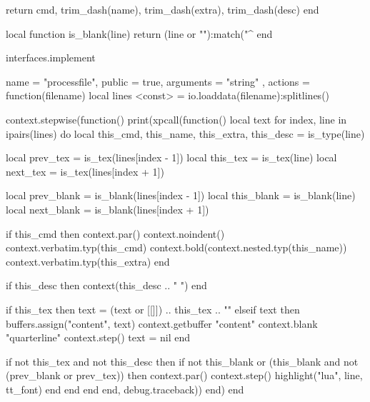         return cmd, trim_dash(name), trim_dash(extra), trim_dash(desc)
    end

    local function is_blank(line)
        return (line or ""):match("^%
    end

    interfaces.implement {
        name = "processfile",
        public = true,
        arguments = { "string" },
        actions = function(filename)
            local lines <const> = io.loaddata(filename):splitlines()

            context.stepwise(function() print(xpcall(function()
                local text
                for index, line in ipairs(lines) do
                    local this_cmd, this_name, this_extra, this_desc = is_type(line)

                    local prev_tex = is_tex(lines[index - 1])
                    local this_tex = is_tex(line)
                    local next_tex = is_tex(lines[index + 1])

                    local prev_blank = is_blank(lines[index - 1])
                    local this_blank = is_blank(line)
                    local next_blank = is_blank(lines[index + 1])

                    if this_cmd then
                        context.par()
                        context.noindent()
                        context.verbatim.typ(this_cmd)
                        context.bold(context.nested.typ(this_name))
                        context.verbatim.typ(this_extra)
                    end

                    if this_desc then
                        context(this_desc .. " ")
                    end

                    if this_tex then
                        text = (text or [[\noindent ]]) .. this_tex .. "\n"
                    elseif text then
                        buffers.assign("content", text)
                        context.getbuffer { "content" }
                        context.blank { "quarterline" }
                        context.step()
                        text = nil
                    end

                    if not this_tex and not this_desc then
                        if not this_blank or
                           (this_blank and not (prev_blank or prev_tex))
                        then
                            context.par()
                            context.step()
                            highlight("lua", line, tt_font)
                        end
                    end
                end
            end, debug.traceback)) end)
        end
    }
\stopluacode

\setuphead[subsection][
    alternative=normal,
    style=\ssbfa,
    after={\blank[disable, penalty:10000]},
    continue=yes,
]

\startdocument[
    title=luatools,
    author=Max Chernoff,
    version=0.0.0, %
    github=https://github.com/gucci-on-fleek/luatools,
]
    \subject{Contents}
    \placecontent[criterium=all]

\stopdocument
